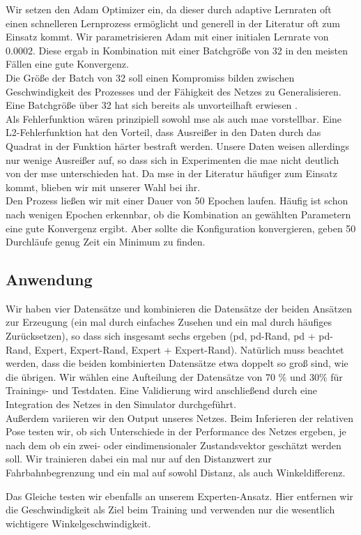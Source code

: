 Wir setzen den Adam Optimizer ein, da dieser durch adaptive Lernraten oft einen schnelleren Lernprozess ermöglicht und generell in der Literatur oft zum Einsatz kommt. Wir parametrisieren Adam mit einer initialen Lernrate von $0.0002$. Diese ergab in Kombination mit einer Batchgröße von 32 in den meisten Fällen eine gute Konvergenz. \\

Die Größe der Batch von 32 soll einen Kompromiss bilden zwischen Geschwindigkeit des Prozesses und der Fähigkeit des Netzes zu Generalisieren. Eine Batchgröße über 32 hat sich bereits als unvorteilhaft erwiesen \cite{keskar2017largebatch}. \\

Als Fehlerfunktion wären prinzipiell sowohl \acs{mse} als auch \acs{mae} vorstellbar. Eine L2-Fehlerfunktion hat den Vorteil, dass Ausreißer in den Daten durch das Quadrat in der Funktion härter bestraft werden. Unsere Daten weisen allerdings nur wenige Ausreißer auf, so dass sich in Experimenten die \acs{mae} nicht deutlich von der \acs{mse} unterschieden hat. Da \acs{mse} in der Literatur häufiger zum Einsatz kommt, blieben wir mit unserer Wahl bei ihr. \\

Den Prozess ließen wir mit einer Dauer von 50 Epochen laufen.  Häufig ist schon nach wenigen Epochen erkennbar, ob die Kombination an gewählten Parametern eine gute Konvergenz ergibt. Aber sollte die Konfiguration konvergieren, geben 50 Durchläufe genug Zeit ein Minimum zu finden.

\subsection{Anwendung}

Wir haben vier Datensätze und kombinieren die Datensätze der beiden Ansätzen zur Erzeugung (ein mal durch einfaches Zusehen und ein mal durch häufiges Zurücksetzen), so dass sich insgesamt sechs ergeben (\glqq \acs{pd}\grqq, \glqq\acs{pd}-Rand\grqq, \glqq\acs{pd} + \acs{pd}-Rand\grqq, \glqq Expert\grqq, \glqq Expert-Rand\grqq, \glqq Expert + Expert-Rand\grqq). Natürlich muss beachtet werden, dass die beiden kombinierten Datensätze etwa doppelt so groß sind, wie die übrigen. Wir wählen eine Aufteilung der Datensätze von 70 \% und 30\% für Trainings- und Testdaten. Eine Validierung wird anschließend durch eine Integration des Netzes in den Simulator durchgeführt.\\

Außerdem variieren wir den Output unseres Netzes. Beim Inferieren der relativen Pose testen wir, ob sich Unterschiede in der Performance des Netzes ergeben, je nach dem ob ein zwei- oder eindimensionaler Zustandsvektor geschätzt werden soll. Wir trainieren dabei ein mal nur auf den Distanzwert zur Fahrbahnbegrenzung und ein mal auf sowohl Distanz, als auch Winkeldifferenz.

Das Gleiche testen wir ebenfalls an unserem Experten-Ansatz. Hier entfernen wir die Geschwindigkeit als Ziel beim Training und verwenden nur die wesentlich wichtigere Winkelgeschwindigkeit.
